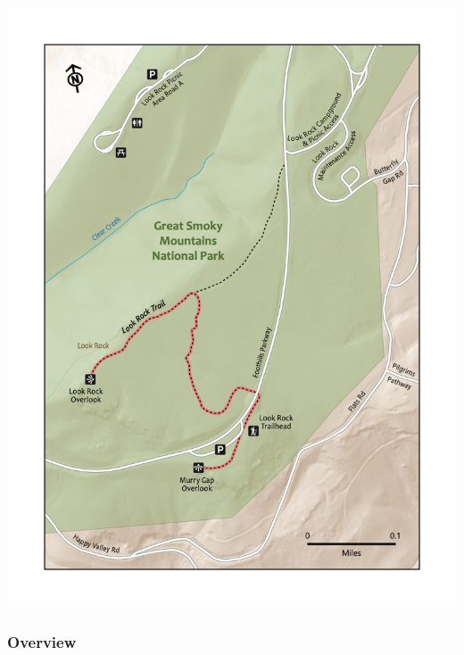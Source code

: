 \documentclass[
  letterpaper,
  DIV=11,
  numbers=noendperiod]{scrartcl}
\begin{document}
\includegraphics{maps/trail-26-map.jpeg}

\hypertarget{overview-25}{%
\subsubsection{Overview}\label{overview-25}}
\end{document}
